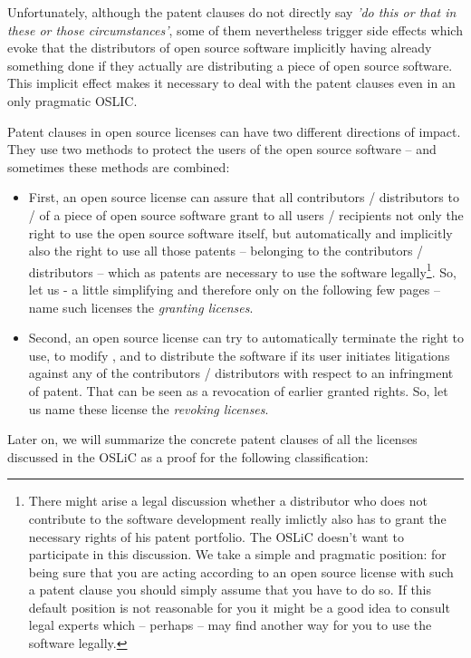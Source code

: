 Unfortunately, although the patent clauses do not directly say \emph{'do this or
that in these or those circumstances'}, some of them nevertheless trigger side
effects which evoke that the distributors of open source software implicitly
having already something done if they actually are distributing a piece of open
source software. This implicit effect makes it necessary to deal with the patent
clauses even in an only pragmatic OSLIC.

Patent clauses in open source licenses can have two different directions of
impact. They use two methods to protect the users of the open source software --
and sometimes these methods are combined:

\begin{itemize}
  \item First, an open source license can assure that all contributors /
  distributors to / of a piece of open source software grant to all users /
  recipients not only the right to use the open source software itself, but
  automatically and implicitly also the right to use all those patents --
  belonging to the contributors / distributors -- which as patents are necessary
  to use the software legally\footnote{There might arise a legal discussion
  whether a distributor who does not contribute to the software development
  really imlictly also has to grant the necessary rights of his patent
  portfolio. The OSLiC doesn't want to participate in this discussion. We take a
  simple and pragmatic position: for being sure that you are acting according to
  an open source license with such a patent clause you should simply assume that
  you have to do so. If this default position is not reasonable for you it might
  be a good idea to consult legal experts which -- perhaps -- may find another
  way for you to use the software legally.}. So, let us - a little simplifying
  and therefore only on the following few pages -- name such licenses the
  \emph{granting licenses}.
  \item Second, an open source license can try to automatically terminate the
  right to use, to modify , and to distribute the software if its user initiates
  litigations against any of the contributors / distributors with respect to an
  infringment of patent. That can be seen as a revocation of earlier granted
  rights. So, let us name these license the \emph{revoking licenses}.
\end{itemize}

Later on, we will summarize the concrete patent clauses of all the licenses
discussed in the OSLiC as a proof for the following classification:

